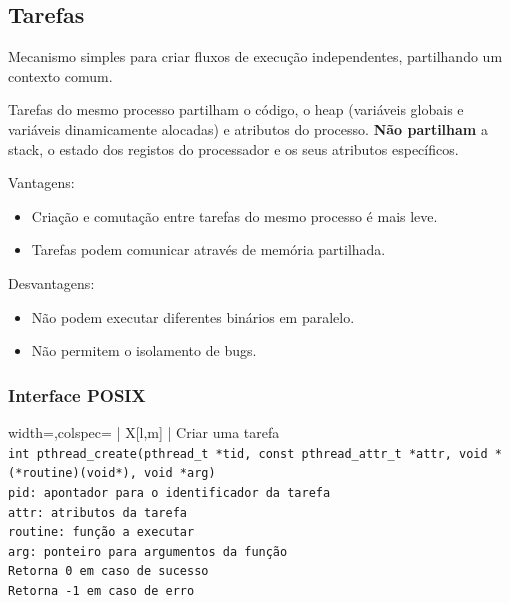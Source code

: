 \documentclass[11pt]{article}
\begin{document}
\newpage

\subsection{Tarefas}

Mecanismo simples para criar fluxos de execução independentes, partilhando um contexto comum.

Tarefas do mesmo processo partilham o código, o heap (variáveis globais e variáveis dinamicamente alocadas) e atributos do processo. \textbf{Não partilham} a stack, o estado dos registos do processador e os seus atributos específicos.

Vantagens:
\begin{itemize}
    \item Criação e comutação entre tarefas do mesmo processo é mais leve.
    \item Tarefas podem comunicar através de memória partilhada.
\end{itemize}

Desvantagens:
\begin{itemize}
    \item Não podem executar diferentes binários em paralelo.
    \item Não permitem o isolamento de bugs.
\end{itemize}

\subsubsection{Interface POSIX}

\begin{tblr}{width=\linewidth,colspec={ | X[l,m] | }}
    \hline
    \centering Criar uma tarefa                                                                                    \\\hline
    \lstinline|int pthread_create(pthread_t *tid, const pthread_attr_t *attr, void *(*routine)(void*), void *arg)| \\\hline
    \lstinline|pid: apontador para o identificador da tarefa|                                                      \\
    \lstinline|attr: atributos da tarefa|                                                                          \\
    \lstinline|routine: função a executar|                                                                         \\
    \lstinline|arg: ponteiro para argumentos da função|                                                            \\\hline
    \lstinline|Retorna 0 em caso de sucesso|                                                                       \\
    \lstinline|Retorna -1 em caso de erro|                                                                         \\\hline
\end{tblr}
\end{document}
